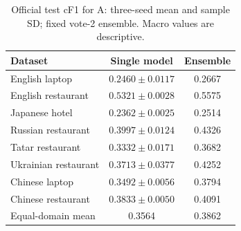 \begin{table}[t]
\centering\small
\caption{Official test cF1 for A: three-seed mean and sample SD; fixed vote-2 ensemble. Macro values are descriptive.}\label{tab:eight}
\begin{tabular}{lcc}
\toprule
Dataset & Single model & Ensemble \\
\midrule
English laptop & $0.2460\pm0.0117$ & 0.2667 \\
English restaurant & $0.5321\pm0.0028$ & 0.5575 \\
Japanese hotel & $0.2362\pm0.0025$ & 0.2514 \\
Russian restaurant & $0.3997\pm0.0124$ & 0.4326 \\
Tatar restaurant & $0.3332\pm0.0171$ & 0.3682 \\
Ukrainian restaurant & $0.3713\pm0.0377$ & 0.4252 \\
Chinese laptop & $0.3492\pm0.0056$ & 0.3794 \\
Chinese restaurant & $0.3833\pm0.0050$ & 0.4091 \\
Equal-domain mean & 0.3564 & 0.3862 \\
\bottomrule
\end{tabular}
\end{table}
